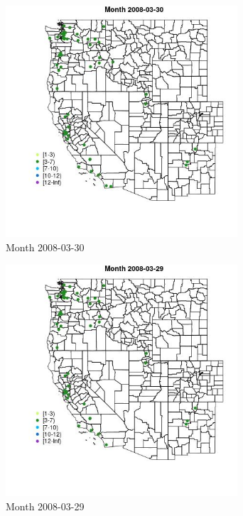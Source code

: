 \begin{figure} 
\centering  
\includegraphics[width=0.77\textwidth]{Code_Outputs/Report_ML_input_PM25_Step4_part_e_de_duplicated_aves_MapObsMonth2008-03-30.jpg} 
\caption{\label{fig:Report_ML_input_PM25_Step4_part_e_de_duplicated_avesMapObsMonth2008-03-30}Month 2008-03-30} 
\end{figure} 
 

\clearpage 

\begin{figure} 
\centering  
\includegraphics[width=0.77\textwidth]{Code_Outputs/Report_ML_input_PM25_Step4_part_e_de_duplicated_aves_MapObsMonth2008-03-29.jpg} 
\caption{\label{fig:Report_ML_input_PM25_Step4_part_e_de_duplicated_avesMapObsMonth2008-03-29}Month 2008-03-29} 
\end{figure} 
 

